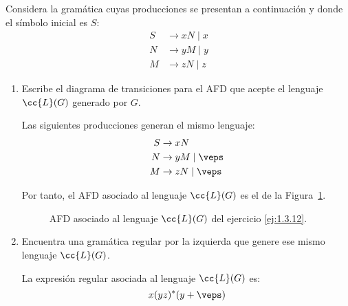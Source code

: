 \begin{ejercicio}\label{ej:1.3.12}
    Considera la gramática cuyas producciones se presentan a continuación y donde el símbolo inicial es $S$:
    \begin{align*}
        S &\rightarrow xN\mid  x \\
        N &\rightarrow yM\mid  y \\
        M &\rightarrow zN\mid  z
    \end{align*}
    \begin{enumerate}
        \item Escribe el diagrama de transiciones para el AFD que acepte el lenguaje $\cc{L}(G)$ generado por $G$.
        
        Las siguientes producciones generan el mismo lenguaje:
        \begin{align*}
            S &\rightarrow xN\\
            N &\rightarrow yM\mid \veps \\
            M &\rightarrow zN\mid \veps
        \end{align*}

        Por tanto, el AFD asociado al lenguaje $\cc{L}(G)$ es el de la Figura~\ref{fig:1.3.12-AFD}.
        \begin{figure}
            \centering
            \caption{AFD asociado al lenguaje $\cc{L}(G)$ del ejercicio \ref{ej:1.3.12}.}
            \label{fig:1.3.12-AFD}
        \end{figure}
        \item Encuentra una gramática regular por la izquierda que genere ese mismo lenguaje $\cc{L}(G)$.
        
        La expresión regular asociada al lenguaje $\cc{L}(G)$ es:
        \begin{equation*}
            x(yz)^{\ast}(y+\veps)
        \end{equation*}
        

\end{enumerate}
\end{ejercicio}
